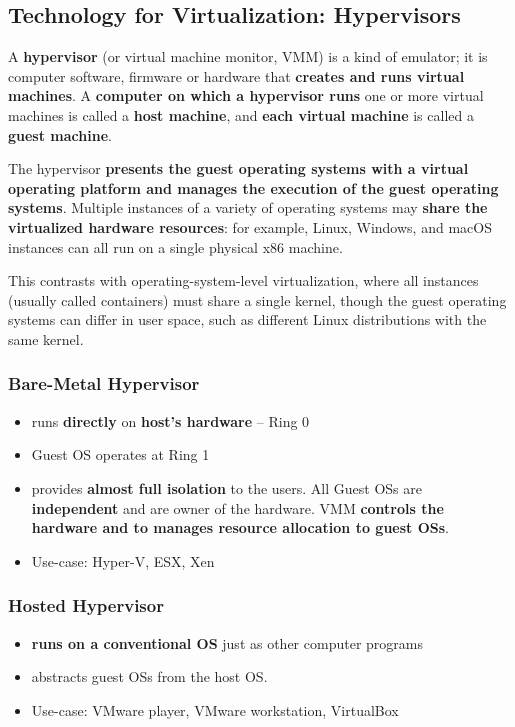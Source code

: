 \subsection{Technology for Virtualization: Hypervisors}
A \textbf{hypervisor} (or virtual machine monitor, VMM) is a kind of emulator; 
it is computer software, firmware or hardware that \textbf{creates and runs virtual machines}. 
A \textbf{computer on which a hypervisor runs} one or more virtual machines is called a \textbf{host machine}, and \textbf{each virtual machine} is called a \textbf{guest machine}. 


The hypervisor \textbf{presents the guest operating systems with a virtual operating platform and manages the execution of the guest operating systems}. Multiple instances of a variety of operating systems may \textbf{share the virtualized hardware resources}: for example, Linux, Windows, and macOS instances can all run on a single physical x86 machine. 


This contrasts with operating-system-level virtualization, where all instances (usually called containers) must share a single kernel, though the guest operating systems can differ in user space, such as different Linux distributions with the same kernel.

\subsubsection{Bare-Metal Hypervisor}
\begin{itemize}
	\item runs \textbf{directly} on \textbf{host's hardware} -- Ring 0
	\item Guest OS operates at Ring 1
	\item provides \textbf{almost full isolation} to the users. All Guest OSs are \textbf{independent} and are owner of the hardware. VMM \textbf{controls the hardware and to manages resource allocation to guest OSs}.
	\item Use-case: Hyper-V, ESX, Xen
	
\end{itemize}

\subsubsection{Hosted Hypervisor}
\begin{itemize}
	\item \textbf{runs on a conventional OS} just as other computer programs
	\item abstracts guest OSs from the host OS. 
	\item Use-case: VMware player, VMware workstation, VirtualBox
\end{itemize}

